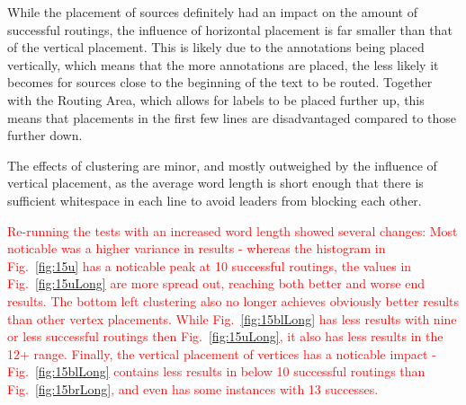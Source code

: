 \documentclass[11pt,a4paper]{vutinfth}
\newcommand{\change}[1]{\textcolor{red}{#1}}
\begin{document}
While the placement of sources definitely had an impact on the amount of successful routings, the influence of horizontal placement is far smaller than that of the vertical placement. This is likely due to the annotations being placed vertically, which means that the more annotations are placed, the less likely it becomes for sources close to the beginning of the text to be routed. Together with the Routing Area, which allows for labels to be placed further up, this means that placements in the first few lines are disadvantaged compared to those further down.

The effects of clustering are minor, and mostly outweighed by the influence of vertical placement, as the average word length is short enough that there is sufficient whitespace in each line to avoid leaders from blocking each other. 

\newpage
\change{Re-running the tests with an increased word length showed several changes: Most noticable was a higher variance in results - whereas the histogram in Fig.~\ref*{fig:15u} has a noticable peak at 10 successful routings, the values in Fig.~\ref*{fig:15uLong} are more spread out, reaching both better and worse end results.
The bottom left clustering also no longer achieves obviously better results than other vertex placements. While Fig.~\ref*{fig:15blLong} has less results with nine or less successful routings then Fig.~\ref*{fig:15uLong}, it also has less results in the 12+ range.
Finally, the vertical placement of vertices has a noticable impact - Fig.~\ref*{fig:15blLong} contains less results in below 10 successful routings than Fig.~\ref*{fig:15brLong}, and even has some instances with 13 successes.}
\end{document}

